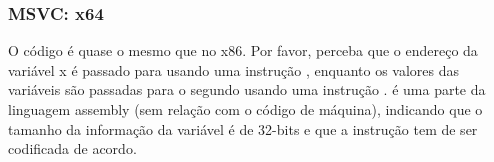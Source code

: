 \PTBRph{}

\subsubsection{MSVC: x64}



O código é quase o mesmo que no x86.
Por favor, perceba que o endereço da variável x é passado para  usando uma instrução \LEA,
enquanto os valores das variáveis são passadas para o segundo \printf usando uma instrução \MOV.
 é uma parte da linguagem assembly (sem relação com o código de máquina),
indicando que o tamanho da informação da variável é de 32-bits e que a instrução \MOV tem de ser codificada de acordo.

